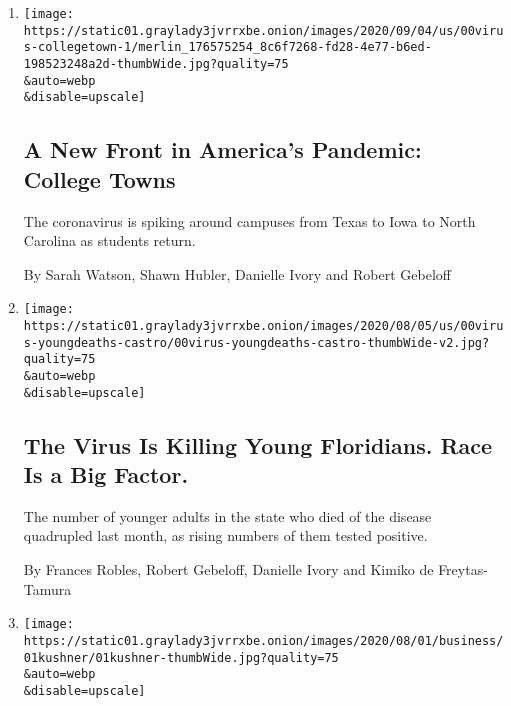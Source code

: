 \begin{enumerate}
\def\labelenumi{\arabic{enumi}.}
\item
  \href{/2020/09/06/us/colleges-coronavirus-students.html}{}

  \texttt{[image: https://static01.graylady3jvrrxbe.onion/images/2020/09/04/us/00virus-collegetown-1/merlin\_176575254\_8c6f7268-fd28-4e77-b6ed-198523248a2d-thumbWide.jpg?quality=75\\\&auto=webp\\\&disable=upscale]}

  \hypertarget{a-new-front-in-americas-pandemic-college-towns}{%
  \subsection{A New Front in America's Pandemic: College
  Towns}\label{a-new-front-in-americas-pandemic-college-towns}}

  The coronavirus is spiking around campuses from Texas to Iowa to North
  Carolina as students return.

  By Sarah Watson, Shawn Hubler, Danielle Ivory and Robert Gebeloff
\item
  \href{/2020/08/11/us/virus-young-deaths.html}{}

  \texttt{[image: https://static01.graylady3jvrrxbe.onion/images/2020/08/05/us/00virus-youngdeaths-castro/00virus-youngdeaths-castro-thumbWide-v2.jpg?quality=75\\\&auto=webp\\\&disable=upscale]}

  \hypertarget{the-virus-is-killing-young-floridians-race-is-a-big-factor}{%
  \subsection{The Virus Is Killing Young Floridians. Race Is a Big
  Factor.}\label{the-virus-is-killing-young-floridians-race-is-a-big-factor}}

  The number of younger adults in the state who died of the disease
  quadrupled last month, as rising numbers of them tested positive.

  By Frances Robles, Robert Gebeloff, Danielle Ivory and Kimiko de
  Freytas-Tamura
\item
  \href{/2020/08/01/business/ivanka-trump-jared-kushner-financial-disclosure.html}{}

  \texttt{[image: https://static01.graylady3jvrrxbe.onion/images/2020/08/01/business/01kushner/01kushner-thumbWide.jpg?quality=75\\\&auto=webp\\\&disable=upscale]}

  \hypertarget{ivanka-trump-and-jared-kushner-report-income-of-at-least-36-million-in-2019}{%
}
\end{enumerate}
